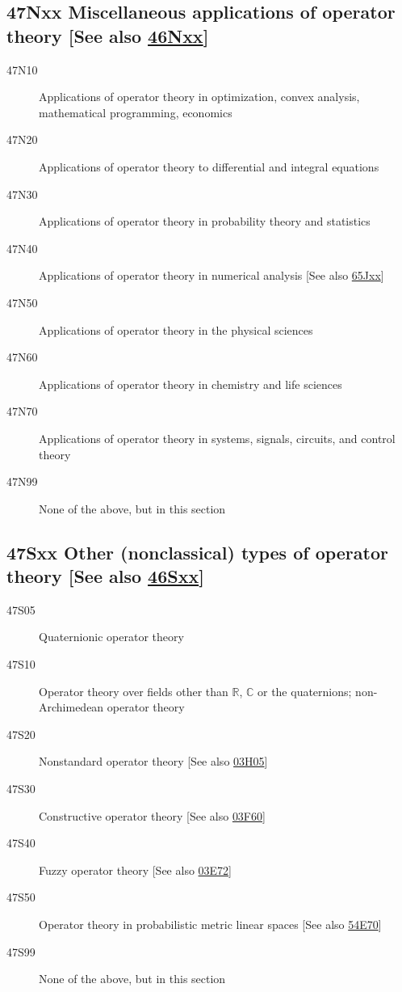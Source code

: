 \subsection*{47Nxx  Miscellaneous applications of operator theory [See also \hyperref[46Nxx]{46Nxx}] }\label{47Nxx}
\begin{description}  
\item [47N10]\label{47N10} Applications of operator theory in optimization, convex analysis, mathematical programming, economics
\item [47N20]\label{47N20} Applications of operator theory to differential and integral equations
\item [47N30]\label{47N30} Applications of operator theory in probability theory and statistics
\item [47N40]\label{47N40} Applications of operator theory in numerical analysis [See also \hyperref[65Jxx]{65Jxx}]
\item [47N50]\label{47N50} Applications of operator theory in the physical sciences
\item [47N60]\label{47N60} Applications of operator theory in chemistry and life sciences
\item [47N70]\label{47N70} Applications of operator theory in systems, signals, circuits, and control theory
\item [47N99]\label{47N99} None of the above, but in this section
\end{description}
\subsection*{47Sxx  Other (nonclassical) types of operator theory [See also \hyperref[46Sxx]{46Sxx}] }\label{47Sxx}
\begin{description}  
\item [47S05]\label{47S05} Quaternionic operator theory
\item [47S10]\label{47S10} Operator theory over fields other than $\mathbb{R}$, $\mathbb{C}$ or the quaternions; non-Archimedean operator theory
\item [47S20]\label{47S20} Nonstandard operator theory [See also \hyperref[03H05]{03H05}]
\item [47S30]\label{47S30} Constructive operator theory [See also \hyperref[03F60]{03F60}]
\item [47S40]\label{47S40} Fuzzy operator theory [See also \hyperref[03E72]{03E72}]
\item [47S50]\label{47S50} Operator theory in probabilistic metric linear spaces [See also \hyperref[54E70]{54E70}]
\item [47S99]\label{47S99} None of the above, but in this section
\end{description}
